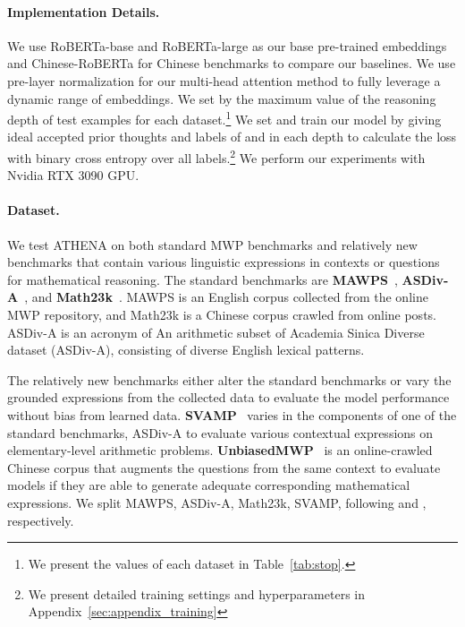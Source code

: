 \documentclass[11pt]{article}
\newcommand{\1}{\mathbb{1}}
\begin{document}
\paragraph{Implementation Details.}
We use RoBERTa-base and RoBERTa-large as our base pre-trained embeddings~\citep{liu-etal-2019-roberta} and Chinese-RoBERTa \citep{chinese-roberta} for Chinese benchmarks to compare our baselines.
We use pre-layer normalization \citep{xiong-etal-2020-layer} for our multi-head attention method to fully leverage a dynamic range of embeddings.
We set  by the maximum value of the reasoning depth of test examples for each dataset.\footnote{We present the values of each dataset in Table~\ref{tab:stop}.}
We set  and train our model by giving ideal accepted prior thoughts  and labels of  and  in each depth to calculate the loss with binary cross entropy over all labels.\footnote{We present detailed training settings and hyperparameters in Appendix~\ref{sec:appendix_training}}
We perform our experiments with Nvidia RTX 3090 GPU.

\paragraph{Dataset.}
We test ATHENA on both standard MWP benchmarks 
and relatively new benchmarks that contain various linguistic expressions in contexts or questions for mathematical reasoning. The standard benchmarks are \textbf{MAWPS}~\citep{koncel-kedziorski-etal-2016-mawps}, \textbf{ASDiv-A}~\citep{miao-etal-2020-diverse}, and \textbf{Math23k}~\citep{wang-etal-2017-deep}. MAWPS is an English corpus collected from the online MWP repository, and
Math23k is a Chinese corpus crawled from online posts. ASDiv-A is an acronym of An arithmetic subset of Academia Sinica Diverse dataset (ASDiv-A), consisting of diverse English lexical patterns.

The relatively new benchmarks either alter the standard benchmarks or vary the grounded expressions from the collected data to evaluate the model performance without bias from learned data. \textbf{SVAMP}~\citep{patel-etal-2021-nlp} varies in the components of one of the standard benchmarks, ASDiv-A to evaluate various contextual expressions on elementary-level arithmetic problems.
\textbf{UnbiasedMWP}~\citep{yang-etal-2022-unbiased} is an online-crawled Chinese corpus that augments the questions from the same context to evaluate models if they are able to generate adequate corresponding mathematical expressions. We split MAWPS, ASDiv-A, Math23k, SVAMP, following \citet{jie-etal-2022-learning} and \citet{patel-etal-2021-nlp}, respectively.
\end{document}
